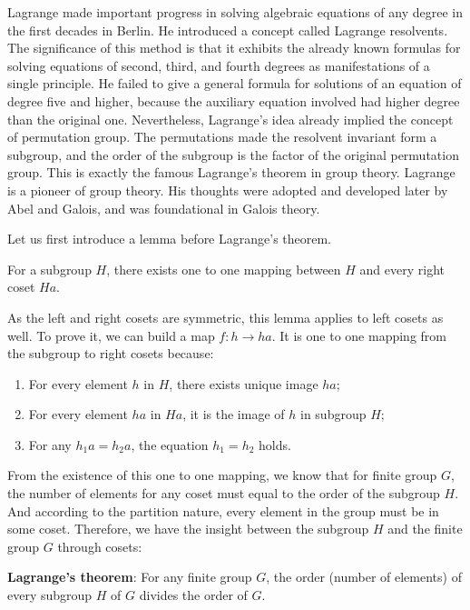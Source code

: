 \documentclass{article}
\begin{document}
Lagrange made important progress in solving algebraic equations of any degree in the first decades in Berlin. He introduced a concept called Lagrange resolvents. The significance of this method is that it exhibits the already known formulas for solving equations of second, third, and fourth degrees as manifestations of a single principle. He failed to give a general formula for solutions of an equation of degree five and higher, because the auxiliary equation involved had higher degree than the original one. Nevertheless, Lagrange's idea already implied the concept of permutation group. The permutations made the resolvent invariant form a subgroup, and the order of the subgroup is the factor of the original permutation group. This is exactly the famous Lagrange's theorem in group theory. Lagrange is a pioneer of group theory. His thoughts were adopted and developed later by Abel and Galois, and was foundational in Galois theory.

Let us first introduce a lemma before Lagrange's theorem.

\begin{lemma}
For a subgroup $H$, there exists one to one mapping between $H$ and every right coset $Ha$.
\end{lemma}

As the left and right cosets are symmetric, this lemma applies to left cosets as well. To prove it, we can build a map $f: h \to ha$. It is one to one mapping from the subgroup to right cosets because:

\begin{enumerate}
\item For every element $h$ in $H$, there exists unique image $ha$;
\item For every element $ha$ in $Ha$, it is the image of $h$ in subgroup $H$;
\item For any $h_1a = h_2a$, the equation $h_1 = h_2$ holds.
\end{enumerate}

From the existence of this one to one mapping, we know that for finite group $G$, the number of elements for any coset must equal to the order of the subgroup $H$. And according to the partition nature, every element in the group must be in some coset. Therefore, we have the insight between the subgroup $H$ and the finite group $G$ through cosets:

\begin{theorem}
\textbf{Lagrange's theorem}: For any finite group $G$, the order (number of elements) of every subgroup $H$ of $G$ divides the order of $G$.
\end{theorem}
\end{document}
